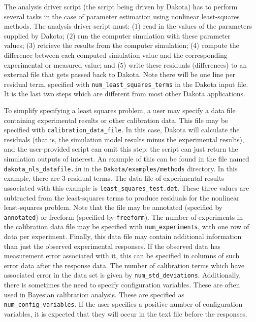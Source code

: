 The analysis driver script (the script being driven by Dakota) 
has to perform several tasks in the case of parameter estimation 
using nonlinear least-squares methods.  The analysis driver script 
must: (1) read in the values of the parameters supplied by Dakota;
(2) run the computer simulation with these parameter values;
(3) retrieve the results from the computer simulation;
(4) compute the difference between each computed simulation value
and the corresponding experimental or measured value; and 
(5) write these residuals (differences)
to an external file that gets passed back to Dakota.  Note there 
will be one line per residual term, specified with 
\texttt{num\_least\_squares\_terms}
in the Dakota input file.   It is the last two steps which are different from 
most other Dakota applications.  

To simplify specifying a least squares problem, a user may specify a
data file containing experimental results or other calibration data.
This file may be specified with \texttt{calibration\_data\_file}. 
In this case, Dakota will calculate the residuals (that is, the
simulation model results minus the experimental results), and the
user-provided script can omit this step: the script can just return
the simulation outputs of interest.  An example of this can be found
in the file named \texttt{dakota\_nls\_datafile.in} in the
\texttt{Dakota/examples/methods} directory.  In this example, there
are 3 residual terms.  The data file of experimental results
associated with this example is \texttt{least\_squares\_test.dat}.
These three values are subtracted from the least-squares terms to
produce residuals for the nonlinear least-squares problem.
Note that the file may be annotated (specified by \texttt{annotated}) or 
freeform (specified by \texttt{freeform}). The number of experiments in the 
calibration data file may be specified with \texttt{num\_experiments}, 
with one row of data per experiment.
Finally, this data file may contain additional information than just the observed 
experimental responses.  If the observed data has measurement error associated with it, 
this can be specified in columns of such error data after the response data. 
The number of calibration terms which have associated error in the data 
set is given by \texttt{num\_std\_deviations}.  Additionally, there is sometimes the 
need to specify configuration variables.  These are often used in Bayesian calibration 
analysis.  These are specified as \texttt{num\_config\_variables}.  If the user 
specifies a positive number of configuration variables, it is expected that they will 
occur in the text file before the responses. 

